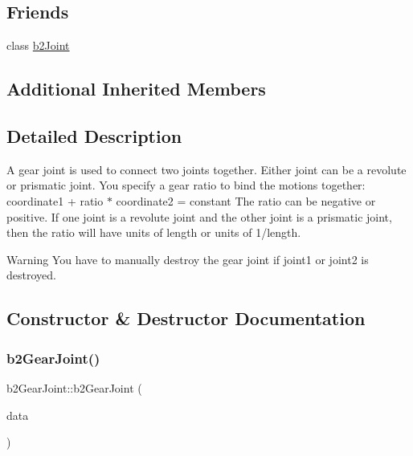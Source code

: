 \subsection*{Friends}
\begin{DoxyCompactItemize}
\item 
class \mbox{\hyperlink{classb2_gear_joint_a54ade8ed3d794298108d7f4c4e4793fa}{b2\+Joint}}
\end{DoxyCompactItemize}
\subsection*{Additional Inherited Members}


\subsection{Detailed Description}
A gear joint is used to connect two joints together. Either joint can be a revolute or prismatic joint. You specify a gear ratio to bind the motions together\+: coordinate1 + ratio $\ast$ coordinate2 = constant The ratio can be negative or positive. If one joint is a revolute joint and the other joint is a prismatic joint, then the ratio will have units of length or units of 1/length. \begin{DoxyWarning}{Warning}
You have to manually destroy the gear joint if joint1 or joint2 is destroyed. 
\end{DoxyWarning}


\subsection{Constructor \& Destructor Documentation}
\mbox{\label{classb2_gear_joint_a4b247c79e74cb1e5b906527fe7d151ce}} 
\subsubsection{\texorpdfstring{b2GearJoint()}{b2GearJoint()}}
{\footnotesize\ttfamily b2\+Gear\+Joint\+::b2\+Gear\+Joint (\begin{DoxyParamCaption}\item[{const \mbox{\hyperlink{structb2_gear_joint_def}{b2\+Gear\+Joint\+Def}} $\ast$}]{data }\end{DoxyParamCaption})\hspace{0.3cm}{\ttfamily [protected]}}



